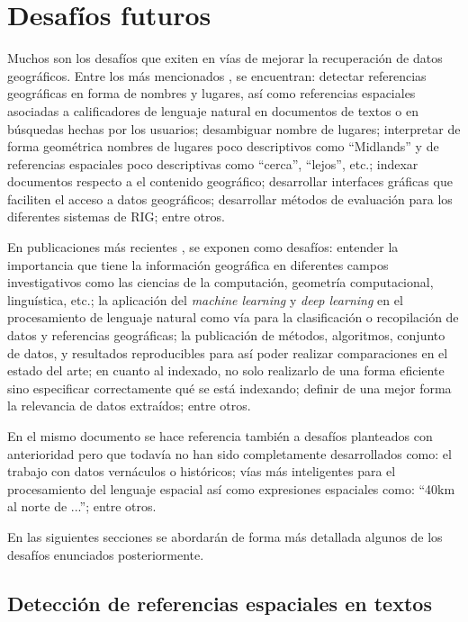 \section{Desafíos futuros}\label{sec:chall}

Muchos son los desafíos que exiten en vías de mejorar la recuperación de datos
geográficos. Entre los más mencionados \cite{purves2014}, se encuentran:
detectar referencias geográficas en forma de nombres y lugares, así como
referencias espaciales asociadas a calificadores de lenguaje natural en
documentos de textos o en búsquedas hechas por los usuarios; desambiguar nombre
de lugares; interpretar de forma geométrica nombres de lugares poco
descriptivos como ``Midlands'' y de referencias espaciales poco descriptivas
como ``cerca'', ``lejos'', etc.; indexar documentos respecto a el contenido
geográfico; desarrollar interfaces gráficas que faciliten el acceso a datos
geográficos; desarrollar métodos de evaluación para los diferentes sistemas de
RIG; entre otros.

En publicaciones más recientes \cite{purves2018}, se exponen como desafíos:
entender la importancia que tiene la información geográfica en diferentes campos
investigativos como las ciencias de la computación, geometría computacional,
linguística, etc.; la aplicación del \emph{machine learning} y \emph{deep
learning} en el procesamiento de lenguaje natural como vía para la
clasificación o recopilación de datos y referencias geográficas; la publicación
de métodos, algoritmos, conjunto de datos, y resultados reproducibles para así
poder realizar comparaciones en el estado del arte; en cuanto al indexado, no
solo realizarlo de una forma eficiente sino especificar correctamente qué se
está indexando; definir de una mejor forma la relevancia de datos extraídos;
entre otros.

En el mismo documento se hace referencia también a desafíos planteados con
anterioridad pero que todavía no han sido completamente desarrollados como: el
trabajo con datos vernáculos o históricos; vías más inteligentes para el
procesamiento del lenguaje espacial así como expresiones espaciales como:
``40km al norte de ...''; entre otros.

En las siguientes secciones se abordarán de forma más detallada algunos de los
desafíos enunciados posteriormente.

\subsection{Detección de referencias espaciales en textos}\label{sec:detect}

